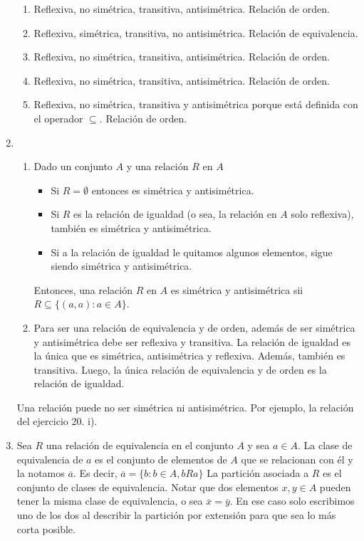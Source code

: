 \begin{enumerate}
\begin{enumerate}
  \item Reflexiva, no simétrica, transitiva, antisimétrica. Relación de orden.
  \item Reflexiva, simétrica, transitiva, no antisimétrica. Relación de equivalencia.
  \item Reflexiva, no simétrica, transitiva, antisimétrica. Relación de orden.
  \item Reflexiva, no simétrica, transitiva, antisimétrica. Relación de orden.
  \item Reflexiva, no simétrica, transitiva y antisimétrica porque está definida con el operador $\subseteq$. Relación de orden.
  \end{enumerate}
\item %
  \begin{enumerate}
  \item Dado un conjunto $A$ y una relación $R$ en $A$
    \begin{itemize}
      \item Si $R = \emptyset$ entonces es simétrica y antisimétrica.
      \item Si $R$ es la relación de igualdad (o sea, la relación en $A$ solo reflexiva), también es simétrica y antisimétrica.
      \item Si a la relación de igualdad le quitamos algunos elementos, sigue siendo simétrica y antisimétrica.
    \end{itemize}
    Entonces, una relación $R$ en $A$ es simétrica y antisimétrica sii $R \subseteq \{(a,a) : a \in A\}$.
  \item Para ser una relación de equivalencia y de orden, además de ser simétrica y antisimétrica debe ser reflexiva y transitiva. La relación de igualdad es la única que es simétrica, antisimétrica y reflexiva. Además, también es transitiva. Luego, la única relación de equivalencia y de orden es la relación de igualdad.
  \end{enumerate}
  Una relación puede no ser simétrica ni antisimétrica. Por ejemplo, la relación del ejercicio 20. i).
\item %
  Sea $R$ una relación de equivalencia en el conjunto $A$ y sea $a \in A$. La clase de equivalencia de $a$ es el conjunto de elementos de $A$ que se relacionan con él y la notamos $\overline{a}$. Es decir, $\overline{a} = \{b : b \in A, b R a\}$\newline
  La partición asociada a $R$ es el conjunto de clases de equivalencia. Notar que dos elementos $x, y \in A$ pueden tener la misma clase de equivalencia, o sea $\overline{x} = \overline{y}$. En ese caso solo escribimos uno de los dos al describir la partición por extensión para que sea lo más corta posible.\newline

\end{enumerate}
